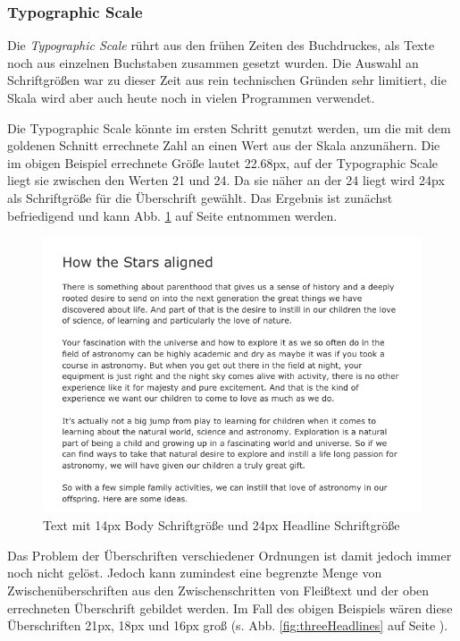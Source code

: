 \subsubsection{Typographic Scale}
Die \textit{Typographic Scale} rührt aus den frühen Zeiten des Buchdruckes, als Texte noch aus einzelnen Buchstaben zusammen gesetzt wurden. Die Auswahl an Schriftgrößen war zu dieser Zeit aus rein technischen Gründen sehr limitiert, die Skala wird aber auch heute noch in vielen Programmen verwendet.

Die Typographic Scale könnte im ersten Schritt genutzt werden, um die mit dem goldenen Schnitt errechnete Zahl an einen Wert aus der Skala anzunähern.
Die im obigen Beispiel errechnete Größe lautet 22.68px, auf der Typographic Scale liegt sie zwischen den Werten 21 und 24. Da sie näher an der 24 liegt wird 24px als Schriftgröße für die Überschrift gewählt. Das Ergebnis ist zunächst befriedigend und kann Abb. \ref{fig:basicHeadline} auf Seite \pageref{fig:basicHeadline} entnommen werden.

\begin{figure}[h]
    \centering
    \includegraphics[width=1\textwidth]{images/Proof-Golden-Ratio.png}
    \caption{Text mit 14px Body Schriftgröße und 24px Headline Schriftgröße}
    \label{fig:basicHeadline}
\end{figure}

Das Problem der Überschriften verschiedener Ordnungen ist damit jedoch immer noch nicht gelöst. Jedoch kann zumindest eine begrenzte Menge von Zwischenüberschriften aus den Zwischenschritten von Fleißtext und der oben errechneten Überschrift gebildet werden. Im Fall des obigen Beispiels wären diese Überschriften 21px, 18px und 16px groß (s. Abb. \ref{fig:threeHeadlines} auf Seite \pageref{fig:threeHeadlines}).

